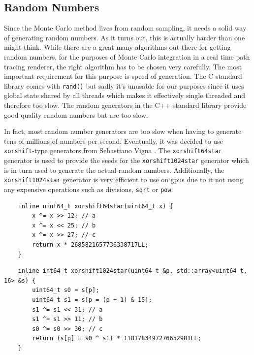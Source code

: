 \documentclass[
  twoside,
  11pt, a4paper,
  footinclude=true,
  headinclude=true,
  cleardoublepage=empty
]{scrreprt}
\begin{document}
\subsection{Random Numbers}
Since the Monte Carlo method lives from random sampling, it needs a solid way of generating random
numbers. As it turns out, this is actually harder than one might think. While there are a great
many algorithms out there for getting random numbers, for the purposes of Monte Carlo integration
in a real time path tracing renderer, the right algorithm has to be chosen very carefully. The most
important requirement for this purpose is speed of generation. The C standard library comes with
\texttt{rand()} but sadly it's unusable for our purposes since it uses global state
shared by all threads which makes it effectively single threaded and therefore too slow.
The random generators in the C++ standard library provide good quality random numbers but are too
slow.

In fact, most random number generators are too slow when having to generate tens of millions of numbers per
second. Eventually, it was decided to use \texttt{xorshift}-type generators from Sebastiano Vigna
\cite{site:xorshift}. The \texttt{xorshift64star} generator is used to provide the seeds for the
\texttt{xorshift1024star} generator which is in turn used to generate the actual random numbers.
Additionally, the \texttt{xorshift1024star} generator is very efficient to use on \acp{gpu} due to
it not using any expensive operations such as divisions, \texttt{sqrt} or \texttt{pow}.

\begin{verbatim}
    inline uint64_t xorshift64star(uint64_t x) {
        x ^= x >> 12; // a
        x ^= x << 25; // b
        x ^= x >> 27; // c
        return x * 2685821657736338717LL;
    }
\end{verbatim}
\begingroup
{}
\endgroup

\begin{verbatim}
    inline int64_t xorshift1024star(uint64_t &p, std::array<uint64_t, 16> &s) {
        uint64_t s0 = s[p];
        uint64_t s1 = s[p = (p + 1) & 15];
        s1 ^= s1 << 31; // a
        s1 ^= s1 >> 11; // b
        s0 ^= s0 >> 30; // c
        return (s[p] = s0 ^ s1) * 1181783497276652981LL;
    }
\end{verbatim}
\begingroup
{}
\endgroup
\end{document}
